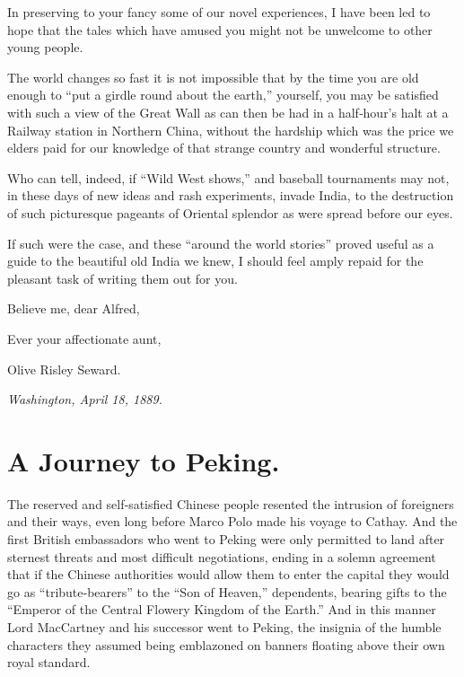 \documentclass[12pt]{book}
\begin{document}
In preserving to your fancy some of our novel experiences, I have been led
to hope that the tales which have amused you might not be unwelcome to other
young people.

The world changes so fast it is not impossible that by the time you are old
enough to “put a girdle round about the earth,” yourself, you may be satisfied
with such a view of the Great Wall as can then be had in a half‐hour’s halt at a
Railway station in Northern China, without the hardship which was the price we
elders paid for our knowledge of that strange country and wonderful structure.

Who can tell, indeed, if “Wild West shows,” and baseball tournaments may not,
in these days of new ideas and rash experiments, invade India, to the destruction
of such picturesque pageants of Oriental splendor as were spread before our eyes.

If such were the case, and these “around the world stories” proved useful as
a guide to the beautiful old India we knew, I should feel amply repaid for the
pleasant task of writing them out for you.

\vspace{1em}

Believe me, dear Alfred,

\vspace{1.5em}
\begin{center}
Ever your affectionate aunt,
\end{center}

\vspace{0.5em}

\hfill {\sc Olive Risley Seward.}

\textit{Washington, April 18, 1889.}

\makeatletter
\renewcommand*\l@chapter{\@dottedtocline{1}{0em}{2.5em}}
\makeatother

\textbf{\tableofcontents}

\renewcommand\thechapter{\Roman{chapter}}

\mainmatter

\chapter{A Journey to Peking.}

The reserved and self‐satisfied Chinese people resented the intrusion of foreigners
and their ways, even long before Marco Polo made his voyage to Cathay. And the
first British embassadors who went to Peking were only permitted to land after
sternest threats and most difficult negotiations, ending in a solemn agreement
that if the Chinese authorities would allow them to enter the capital they would
go as “tribute‐bearers” to the “Son of Heaven,” dependents, bearing gifts to the
“Emperor of the Central Flowery Kingdom of the Earth.” And in this manner
Lord MacCartney and his successor went to Peking, the insignia of the humble
characters they assumed being emblazoned on banners floating above their own
royal standard.
\end{document}

